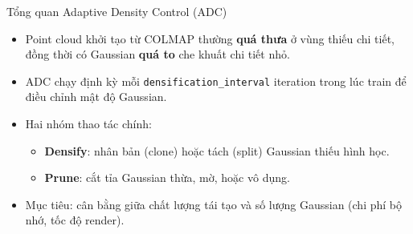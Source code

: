 
\begin{frame}{Tổng quan Adaptive Density Control (ADC)}
    \begin{itemize}
        \item Point cloud khởi tạo từ COLMAP thường \textbf{quá thưa} ở vùng thiếu chi tiết, đồng thời có Gaussian \textbf{quá to} che khuất chi tiết nhỏ.
        \item ADC chạy định kỳ mỗi \texttt{densification\_interval} iteration trong lúc train để điều chỉnh mật độ Gaussian.
        \item Hai nhóm thao tác chính:
        \begin{itemize}
            \item \textbf{Densify}: nhân bản (clone) hoặc tách (split) Gaussian thiếu hình học.
            \item \textbf{Prune}: cắt tỉa Gaussian thừa, mờ, hoặc vô dụng.
        \end{itemize}
        \item Mục tiêu: cân bằng giữa chất lượng tái tạo và số lượng Gaussian (chi phí bộ nhớ, tốc độ render).
    \end{itemize}
    \vspace{0.3cm}
    \centering
\end{frame}

